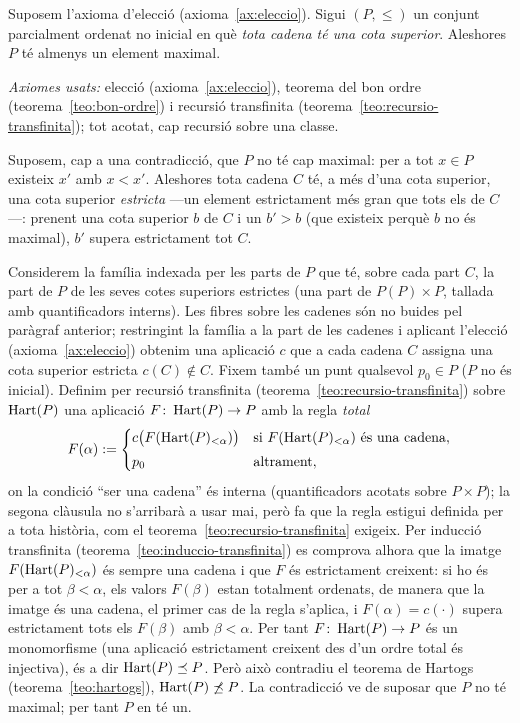 \begin{teorema}\label{teo:zorn}
Suposem l'axioma d'elecció (axioma~\ref{ax:eleccio}). Sigui \((P,\le)\) un
conjunt parcialment ordenat no inicial en què \emph{tota cadena té una cota
superior}. Aleshores \(P\) té almenys un element maximal.\par
\emph{Axiomes usats:} elecció (axioma~\ref{ax:eleccio}), teorema del bon
ordre (teorema~\ref{teo:bon-ordre}) i recursió transfinita
(teorema~\ref{teo:recursio-transfinita}); tot acotat, cap recursió sobre una
classe.
\end{teorema}

\begin{prova}
Suposem, cap a una contradicció, que \(P\) no té cap maximal: per a tot
\(x\in P\) existeix \(x'\) amb \(x<x'\). Aleshores tota cadena \(C\) té, a
més d'una cota superior, una cota superior \emph{estricta} ---un element
estrictament més gran que tots els de \(C\)---: prenent una cota superior
\(b\) de \(C\) i un \(b'>b\) (que existeix perquè \(b\) no és maximal),
\(b'\) supera estrictament tot \(C\).

Considerem la família indexada per les parts de \(P\) que té, sobre cada
part \(C\), la part de \(P\) de les seves cotes superiors estrictes
(una part de \(P(P)\times P\), tallada amb quantificadors interns). Les
fibres sobre les cadenes són no buides pel paràgraf anterior; restringint
la família a la part de les cadenes i aplicant l'elecció
(axioma~\ref{ax:eleccio}) obtenim una aplicació \(c\) que a cada cadena
\(C\) assigna una cota superior estricta \(c(C)\notin C\). Fixem també un
punt qualsevol \(p_0\in P\) (\(P\) no és inicial). Definim per recursió
transfinita (teorema~\ref{teo:recursio-transfinita}) sobre \(\operatorname{Hart}(P)\) una
aplicació \(F\colon\operatorname{Hart}(P)\to P\) amb la regla \emph{total}
\[
F(\alpha):=
\begin{cases}
c\bigl(F(\operatorname{Hart}(P)_{<\alpha})\bigr) & \text{si } F(\operatorname{Hart}(P)_{<\alpha})\text{ és una cadena},\\[1mm]
p_0 & \text{altrament},
\end{cases}
\]
on la condició \enquote{ser una cadena} és interna (quantificadors acotats
sobre \(P\times P\)); la segona clàusula no s'arribarà a usar mai, però fa
que la regla estigui definida per a tota història, com el
teorema~\ref{teo:recursio-transfinita} exigeix. Per inducció transfinita
(teorema~\ref{teo:induccio-transfinita}) es comprova alhora que la imatge
\(F(\operatorname{Hart}(P)_{<\alpha})\) és sempre una cadena i que \(F\) és estrictament
creixent: si ho és per a tot \(\beta<\alpha\), els valors \(F(\beta)\)
estan totalment ordenats, de manera que la imatge és una cadena, el primer
cas de la regla s'aplica, i \(F(\alpha)=c(\cdot)\) supera estrictament tots
els \(F(\beta)\) amb \(\beta<\alpha\). Per tant \(F\colon\operatorname{Hart}(P)\to P\) és un
monomorfisme (una aplicació estrictament creixent des d'un ordre total és
injectiva), és a dir \(\operatorname{Hart}(P)\preceq P\). Però això contradiu el teorema de
Hartogs (teorema~\ref{teo:hartogs}), \(\operatorname{Hart}(P)\not\preceq P\). La
contradicció ve de suposar que \(P\) no té maximal; per tant \(P\) en té un.
\end{prova}

